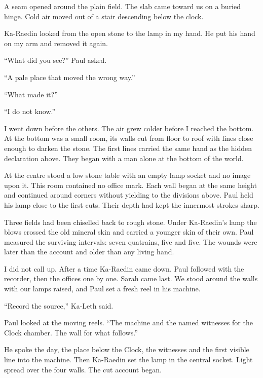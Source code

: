 A seam opened around the plain field. The slab came toward us on a buried hinge. Cold air moved out of a stair descending below the clock.\par

Ka-Raedin looked from the open stone to the lamp in my hand. He put his hand on my arm and removed it again.\par

``What did you see?'' Paul asked.\par

``A pale place that moved the wrong way.''\par

``What made it?''\par

``I do not know.''\par

I went down before the others. The air grew colder before I reached the bottom. At the bottom was a small room, its walls cut from floor to roof with lines close enough to darken the stone. The first lines carried the same hand as the hidden declaration above. They began with a man alone at the bottom of the world.\par

At the centre stood a low stone table with an empty lamp socket and no image upon it. This room contained no office mark. Each wall began at the same height and continued around corners without yielding to the divisions above. Paul held his lamp close to the first cuts. Their depth had kept the innermost strokes sharp.\par

Three fields had been chiselled back to rough stone. Under Ka-Raedin's lamp the blows crossed the old mineral skin and carried a younger skin of their own. Paul measured the surviving intervals: seven quatrains, five and five. The wounds were later than the account and older than any living hand.\par

I did not call up. After a time Ka-Raedin came down. Paul followed with the recorder, then the offices one by one. Sarah came last. We stood around the walls with our lamps raised, and Paul set a fresh reel in his machine.\par

``Record the source,'' Ka-Leth said.\par

Paul looked at the moving reels. ``The machine and the named witnesses for the Clock chamber. The wall for what follows.''\par

He spoke the day, the place below the Clock, the witnesses and the first visible line into the machine. Then Ka-Raedin set the lamp in the central socket. Light spread over the four walls. The cut account began.\par

\ornament
